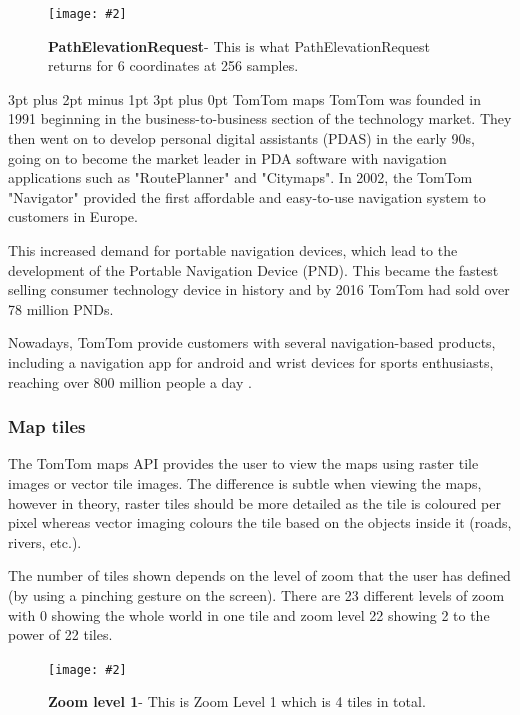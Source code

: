 \documentclass[12pt,a4paper]{article}
\makeatletter
\newcommand{\figuremacro}[5]{
    \begin{figure}[#1]
        \centering
        \texttt{[image: \#2]}
        \caption[#3]{\textbf{#3}#4}
        \label{fig:#2}
    \end{figure}
}
\renewcommand\subsection{\@startsection {subsection}{1}{2mm} %
                               {3pt plus 2pt minus 1pt} %
                               {3pt plus 0pt} %
                               {\normalfont\bfseries}}
\makeatother
\begin{document}
\figuremacro{h}{googleElevationPath}{PathElevationRequest}{- This is what PathElevationRequest returns for 6 coordinates at 256 samples.}{1.0} 

\subsection{TomTom maps}
TomTom was founded in 1991 beginning in the business-to-business section of the technology market. They then went on to develop personal digital assistants (PDAS) in the early 90s, going on to become the market leader in PDA software with navigation applications such as "RoutePlanner" and "Citymaps". In 2002, the TomTom "Navigator" provided the first affordable and easy-to-use navigation system to customers in Europe.

This increased demand for portable navigation devices, which lead to the development of the Portable Navigation Device (PND). This became the fastest selling consumer technology device in history and by 2016 TomTom had sold over 78 million PNDs.

Nowadays, TomTom provide customers with several navigation-based products, including a navigation app for android and wrist devices for sports enthusiasts, reaching over 800 million people a day \cite{TomTomHist}.

\subsubsection{Map tiles}
The TomTom maps API provides the user to view the maps using raster tile images or vector tile images. The difference is subtle when viewing the maps, however in theory, raster tiles should be more detailed as the tile is coloured per pixel whereas vector imaging colours the tile based on the objects inside it (roads, rivers, etc.).

The number of tiles shown depends on the level of zoom that the user has defined (by using a pinching gesture on the screen). There are 23 different levels of zoom with 0 showing the whole world in one tile and zoom level 22 showing 2 to the power of 22 tiles. 

\figuremacro{h}{TomTomZoom1}{Zoom level 1}{- This is Zoom Level 1 which is 4 tiles in total.}{1.0} 
\end{document}
